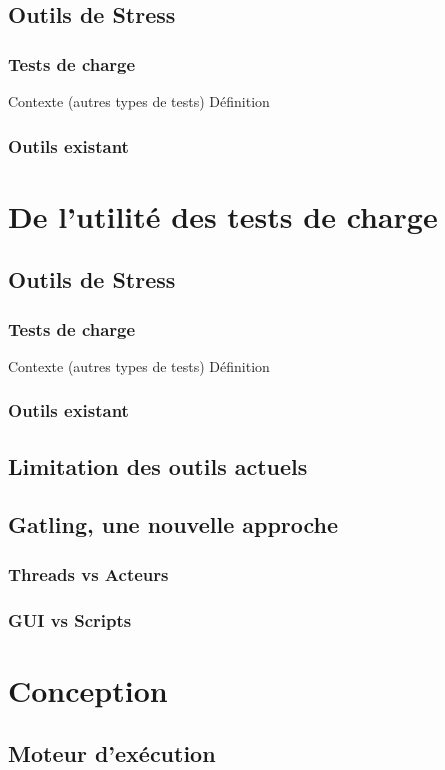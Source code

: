 \documentclass[12pt]{report}
\begin{document}
  \section{Outils de Stress}
  \subsection{Tests de charge}
    Contexte (autres types de tests)
    Définition
  \subsection{Outils existant}
  
  \chapter{De l'utilité des tests de charge}
  \section{Outils de Stress}
  \subsection{Tests de charge}
    Contexte (autres types de tests)
    Définition
  \subsection{Outils existant}
  \section{Limitation des outils actuels}
  \section{Gatling, une nouvelle approche}
  \subsection{Threads vs Acteurs}
  \subsection{GUI vs Scripts}
  
  \chapter{Conception}
  \section{Moteur d'exécution}
\end{document}
